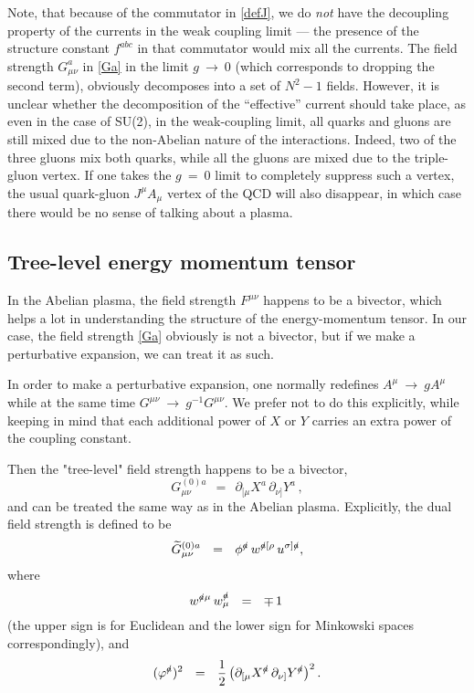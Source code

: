 \documentclass[epsfig,12pt]{article}
\def\beq{\begin{equation}}
\def\eeq{\end{equation}}
\newcommand{\p}{\partial}
\newcommand{\wt}{\widetilde}
\begin{document}
	Note, that because of the commutator in \eqref{defJ}, we do \emph{not} have the decoupling
	property of the currents in the weak coupling limit --- the presence of the structure constant $ f^{abc} $
	in that commutator would mix all the currents.
	The field strength $ G_{\mu\nu}^a $ in \eqref{Ga} in the limit $ g ~\to~ 0 $
	(which corresponds to dropping the second term), obviously decomposes into a set of $ N^2 - 1 $
	fields.
	However, it is unclear whether the decomposition of the ``effective'' current should take place,
	as even in the case of SU(2), in the weak-coupling limit, all quarks and gluons are still mixed
	due to the non-Abelian nature of the interactions.
	Indeed, two of the three gluons mix both quarks, while all the gluons are mixed due to the triple-gluon
        vertex.
	If one takes the $ g ~=~ 0 $ limit to completely suppress such a vertex, the usual quark-gluon
        $ J^\mu A_\mu $ vertex of the QCD will also disappear, in which case there would be no sense of talking about a plasma.


\subsection{Tree-level energy momentum tensor}
	In the Abelian plasma, the field strength $ F^{\mu\nu} $ happens to be a bivector,
	which helps a lot in understanding the structure of the energy-momentum tensor.
	In our case, the field strength \eqref{Ga} obviously is not a bivector, but
	if we make a perturbative expansion, we can treat it as such.
	
	In order to make a perturbative expansion, one normally redefines $ A^\mu ~\to~ g A^\mu $
	while at the same time $ G^{\mu\nu} ~\to~ g^{-1} G^{\mu\nu} $.
	We prefer not to do this explicitly, while keeping in mind that each additional power of $ X $ or $ Y $
	carries an extra power of the coupling constant.

	Then the "tree-level" field strength happens to be a bivector,
\beq
	G_{\mu\nu}^{(0)a}    ~~=~~    \p_{[\mu} X^a\, \p_{\nu]} Y^a\,,
\eeq
	and can be treated the same way as in the Abelian plasma.
	Explicitly, the dual field strength is defined to be
\beq
	\wt{G}{}_{\mu\nu}^{(0)a}    ~~=~~    \phi^\slashed{a}\, w^{\slashed{a}[\rho}\, u^{\sigma]\slashed{a}},
\eeq
	where
\beq
	w^{\slashed{a}\mu}\, w^{\slashed{a}}_\mu    ~~=~~    \mp\,1\,
\eeq
	(the upper sign is for Euclidean and the lower sign for Minkowski spaces correspondingly),
	and
\beq
	( \varphi^\slashed{a} )^2    ~~=~~    \frac{1}{2}\, \big( \p_{[\mu} X^\slashed{a}\, \p_{\nu]} Y^\slashed{a} \big)^2\,.
\eeq
\end{document}
